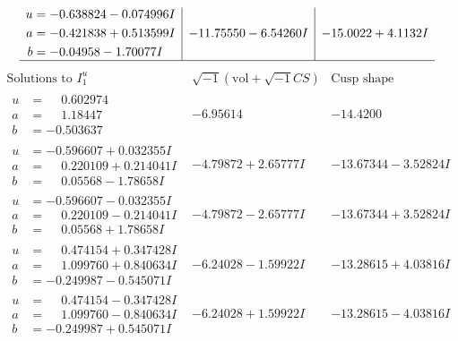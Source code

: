 \documentclass[1p]{elsarticle_modified}
\theoremstyle{definition}
\newcommand{\I}{\sqrt{-1}}
\begin{document}
$$\begin{array}{c|c|c}
\begin{aligned}
u &= -0.638824 - 0.074996 I \\
a &= -0.421838 + 0.513599 I \\
b &= -0.04958 - 1.70077 I\end{aligned}
 & -11.75550 - 6.54260 I & -15.0022 + 4.1132 I\\
 \hline 
 \end{array}$$\newpage$$\begin{array}{c|c|c}  
\text{Solutions to }I^u_{1}& \I (\text{vol} + \sqrt{-1}CS) & \text{Cusp shape}\\
 \hline 
\begin{aligned}
u &= \phantom{-}0.602974\phantom{ +0.000000I} \\
a &= \phantom{-}1.18447\phantom{ +0.000000I} \\
b &= -0.503637\phantom{ +0.000000I}\end{aligned}
 & -6.95614\phantom{ +0.000000I} & -14.4200\phantom{ +0.000000I} \\ \hline\begin{aligned}
u &= -0.596607 + 0.032355 I \\
a &= \phantom{-}0.220109 + 0.214041 I \\
b &= \phantom{-}0.05568 - 1.78658 I\end{aligned}
 & -4.79872 + 2.65777 I & -13.67344 - 3.52824 I \\ \hline\begin{aligned}
u &= -0.596607 - 0.032355 I \\
a &= \phantom{-}0.220109 - 0.214041 I \\
b &= \phantom{-}0.05568 + 1.78658 I\end{aligned}
 & -4.79872 - 2.65777 I & -13.67344 + 3.52824 I \\ \hline\begin{aligned}
u &= \phantom{-}0.474154 + 0.347428 I \\
a &= \phantom{-}1.099760 + 0.840634 I \\
b &= -0.249987 - 0.545071 I\end{aligned}
 & -6.24028 - 1.59922 I & -13.28615 + 4.03816 I \\ \hline\begin{aligned}
u &= \phantom{-}0.474154 - 0.347428 I \\
a &= \phantom{-}1.099760 - 0.840634 I \\
b &= -0.249987 + 0.545071 I\end{aligned}
 & -6.24028 + 1.59922 I & -13.28615 - 4.03816 I \\ \hline\begin{aligned}

\end{aligned}
\end{array}$$
\end{document}
